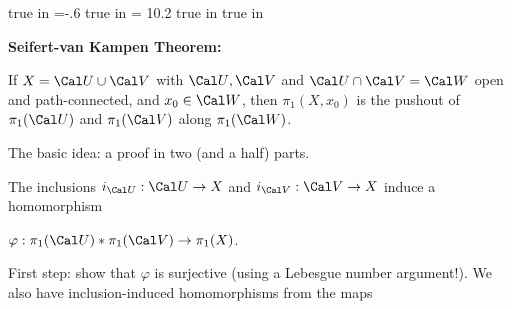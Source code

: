 
\overfullrule=0pt
\parindent=0pt

\nopagenumbers




 true in
\hoffset=-.6 true in
\hsize = 10.2 true in
 true in



\def\cltr{\Red}		  %

\loadmsbm



\def\ctln{\centerline}
\def\u{\underbar}
\def\ssk{\smallskip}
\def\msk{\medskip}
\def\bsk{\bigskip}
\def\hsk{\hskip.1in}
\def\hhsk{\hskip.2in}
\def\dsl{\displaystyle}
\def\hskp{\hskip1.5in}

\def\lra{$\Leftrightarrow$ }
\def\ra{\rightarrow}
\def\mpto{\logmapsto}
\def\pu{\pi_1}
\def\mpu{$\pi_1$}
\def\sig{\Sigma}
\def\msig{$\Sigma$}
\def\ep{\epsilon}
\def\sset{\subseteq}
\def\del{\partial}
\def\inv{^{-1}}
\def\wtl{\widetilde}
\def\del{\partial}
\def\delp{\partial^\prime}
\def\delpp{\partial^{\prime\prime}}
\def\sgn{{\roman{sgn}}}
\def\wtih{\widetilde{H}}
\def\bbz{{\Bbb Z}}
\def\bbr{{\Bbb R}}
\def\rtar{$\Rightarrow$}

\def\cltr{\Red}		  %
\def\cltb{\Blue}		  %
\def\cltg{\PineGreen}	  %

{\bf Seifert-van Kampen Theorem:}

\msk

If $X={\Cal U}\cup{\Cal V}$ with ${\Cal U},{\Cal V}$ and ${\Cal U}\cap{\Cal V}={\Cal W}$ open and path-connected, and
$x_0\in{\Cal W}$, then $\pi_1(X,x_0)$ is the pushout of $\pi_1({\Cal U})$ and $\pi_1({\Cal V})$ along $\pi_1({\Cal W})$.

\msk

The basic idea: a proof in two (and a half) parts.

\ssk

The inclusions $i_{\Cal U}:{\Cal U}\ra X$ and $i_{\Cal V}:{\Cal V}\ra X$ induce a homomorphism

\ssk

$\varphi:\pi_1({\Cal U})*\pi_1({\Cal V})\ra\pi_1(X)$. 

\ssk

First step: show that $\varphi$ is surjective
(using a Lebesgue number argument!). We also have inclusion-induced homomorphisms from the
maps 


